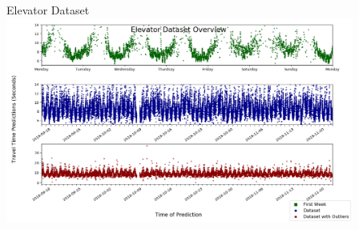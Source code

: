 \documentclass{beamer}
\begin{document}
\begin{frame}[t]{Elevator Dataset}
  \vspace*{0.40cm}
  {\includegraphics[width = 4.5in]{images/data_overview/elevator_dataset_overview.png}}


\end{frame}
\end{document}
